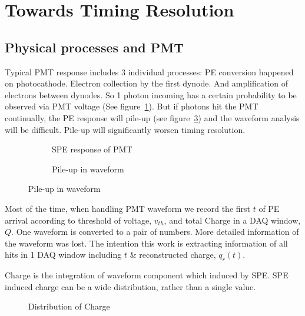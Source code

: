 \section{Towards Timing Resolution} %
\label{sec:toyMC}

\subsection{Physical processes and PMT}

Typical PMT response includes 3 individual processes: PE conversion happened on photocathode. Electron collection by the first dynode. And amplification of electrons between dynodes. So 1 photon incoming has a certain probability to be observed via PMT voltage (See figure~\ref{fig:spe}). But if photons hit the PMT continually, the PE response will pile-up (see figure~\ref{fig:pile}) and the waveform analysis will be difficult. Pile-up will significantly worsen timing resolution. 

\begin{figure}[H]
\begin{minipage}[b]{.5\textwidth}
\begin{figure}[H]
    \centering
    \resizebox{\textwidth}{!}{}
    \caption{\label{fig:spe} SPE response of PMT}
\end{figure}
\end{minipage}
\begin{minipage}[b]{.5\textwidth}
\begin{figure}[H]
    \centering
    \resizebox{\textwidth}{!}{}
    \caption{\label{fig:pile} Pile-up in waveform}
\end{figure}
\end{minipage}
\end{figure}

Most of the time, when handling PMT waveform we record the first $t$ of PE arrival according to threshold of voltage, $v_{th}$, and total Charge in a DAQ window, $Q$. One waveform is converted to a pair of numbers. More detailed information of the waveform was lost. The intention this work is extracting information of all hits in 1 DAQ window including $t$ \& reconstructed charge, $q_{r}(t)$. 

Charge is the integration of waveform component which induced by SPE. SPE induced charge can be a wide distribution, rather than a single value. 

\begin{minipage}[b]{1.\textwidth}
\begin{figure}[H]
    \centering
    \scalebox{0.4}{}
    \caption{\label{fig:charge} Distribution of Charge}
\end{figure}
\end{minipage}

